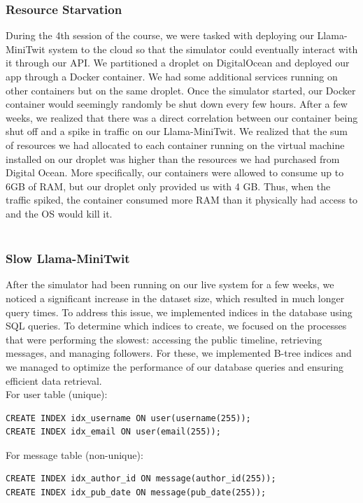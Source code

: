 \documentclass{article}
\begin{document}
\subsubsection{Resource Starvation}
During the 4th session of the course, we were tasked with deploying our Llama-MiniTwit system to the cloud so that the simulator could eventually interact with it through our API. We partitioned a droplet on DigitalOcean and deployed our app through a Docker container. We had some additional services running on other containers but on the same droplet. Once the simulator started, our Docker container would seemingly randomly be shut down every few hours. After a few weeks, we realized that there was a direct correlation between our container being shut off and a spike in traffic on our Llama-MiniTwit. We realized that the sum of resources we had allocated to each container running on the virtual machine installed on our droplet was higher than the resources we had purchased from Digital Ocean. More specifically, our containers were allowed to consume up to 6GB of RAM, but our droplet only provided us with 4 GB. Thus, when the traffic spiked, the container consumed more RAM than it physically had access to and the OS would kill it.
\\\\

\subsubsection{Slow Llama-MiniTwit}
After the simulator had been running on our live system for a few weeks, we noticed a significant increase in the dataset size, which resulted in much longer query times. To address this issue, we implemented indices in the database using SQL queries. To determine which indices to create, we focused on the processes that were performing the slowest: accessing the public timeline, retrieving messages, and managing followers. For these, we implemented B-tree indices and we managed to optimize the performance of our database queries and ensuring efficient data retrieval.
\\
For user table (unique):
\begin{verbatim}
CREATE INDEX idx_username ON user(username(255));
CREATE INDEX idx_email ON user(email(255));
\end{verbatim}

For message table (non-unique):
\begin{verbatim}
CREATE INDEX idx_author_id ON message(author_id(255));
CREATE INDEX idx_pub_date ON message(pub_date(255));
\end{verbatim}
\end{document}
